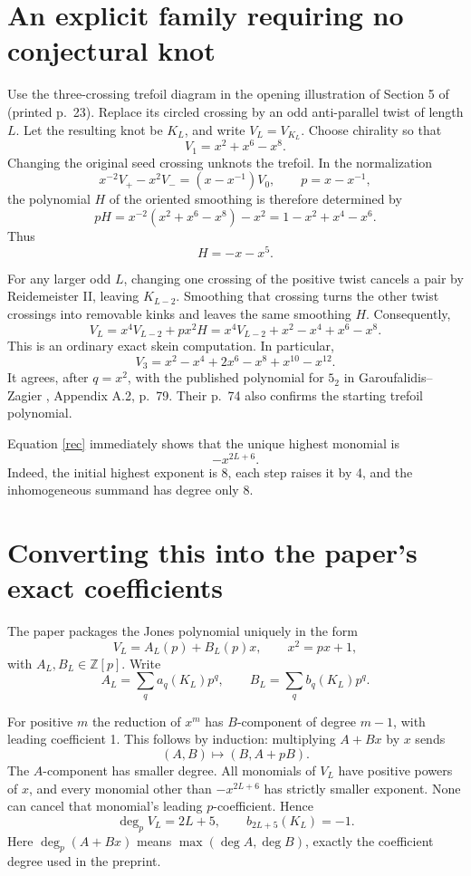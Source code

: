 \documentclass[11pt]{article}
\begin{document}
\section*{An explicit family requiring no conjectural knot}
Use the three-crossing trefoil diagram in the opening illustration of Section 5 of \cite{CC} (printed p.~23). Replace its circled crossing by an odd anti-parallel twist of length $L$. Let the resulting knot be $K_L$, and write $V_L=V_{K_L}$. Choose chirality so that
\[
V_1=x^2+x^6-x^8.
\]
Changing the original seed crossing unknots the trefoil. In the normalization
\[
x^{-2}V_+-x^2V_-=(x-x^{-1})V_0,\qquad p=x-x^{-1},
\]
the polynomial $H$ of the oriented smoothing is therefore determined by
\[
pH=x^{-2}(x^2+x^6-x^8)-x^2
=1-x^2+x^4-x^6.
\]
Thus
\[
H=-x-x^5.
\]

For any larger odd $L$, changing one crossing of the positive twist cancels a pair by Reidemeister II, leaving $K_{L-2}$. Smoothing that crossing turns the other twist crossings into removable kinks and leaves the same smoothing $H$. Consequently,
\begin{equation}\label{rec}
V_L=x^4V_{L-2}+px^2H
=x^4V_{L-2}+x^2-x^4+x^6-x^8.
\end{equation}
This is an ordinary exact skein computation. In particular,
\[
V_3=x^2-x^4+2x^6-x^8+x^{10}-x^{12}.
\]
It agrees, after $q=x^2$, with the published polynomial for $5_2$ in Garoufalidis--Zagier \cite{GZ}, Appendix A.2, p.~79. Their p.~74 also confirms the starting trefoil polynomial.

Equation \eqref{rec} immediately shows that the unique highest monomial is
\[
-x^{2L+6}.
\]
Indeed, the initial highest exponent is 8, each step raises it by 4, and the inhomogeneous summand has degree only 8.

\section*{Converting this into the paper's exact coefficients}
The paper packages the Jones polynomial uniquely in the form
\[
V_L=A_L(p)+B_L(p)x,\qquad x^2=px+1,
\]
with $A_L,B_L\in\mathbb Z[p]$. Write
\[
A_L=\sum_q a_q(K_L)p^q,\qquad
B_L=\sum_q b_q(K_L)p^q.
\]

For positive $m$ the reduction of $x^m$ has $B$-component of degree $m-1$, with leading coefficient 1. This follows by induction: multiplying $A+Bx$ by $x$ sends
\[
(A,B)\longmapsto (B,A+pB).
\]
The $A$-component has smaller degree. All monomials of $V_L$ have positive powers of $x$, and every monomial other than $-x^{2L+6}$ has strictly smaller exponent. None can cancel that monomial's leading $p$-coefficient. Hence
\begin{equation}\label{actual}
\deg_p V_L=2L+5,\qquad b_{2L+5}(K_L)=-1.
\end{equation}
Here $\deg_p(A+Bx)$ means $\max(\deg A,\deg B)$, exactly the coefficient degree used in the preprint.
\end{document}
